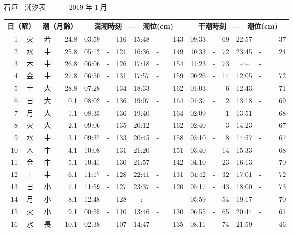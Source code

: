 \documentclass[12pt,a4j]{jsarticle}
\begin{document}
\pagestyle{empty}
 \begin{center}
 {\LARGE 石垣　潮汐表　　　}
 {\large 2019 年  1 月}\\
 \begin{table}[ht]
    \begin{tabular}{|rc|cr|ccrccr|ccrccr|}
    \hline
    \multicolumn{2}{|c|}{日（曜）} & \multicolumn{2}{c|}{潮（月齢）} & \multicolumn{6}{c|}{満潮時刻　―　潮位(cm)} & \multicolumn{6}{c|}{干潮時刻　―　潮位(cm)} \\
 \hline
 1 & 火 & 若 & 24.8 &  03:59 &-& 116  &  15:48 &-& 143  &   09:33 &-&  69  &   22:57 &-&  37  \\
 2 & 水 & 中 & 25.8 &  05:12 &-& 121  &  16:36 &-& 149  &   10:33 &-&  72  &   23:45 &-&  24  \\
 3 & 木 & 中 & 26.8 &  06:06 &-& 126  &  17:18 &-& 154  &   11:23 &-&  73  &   --:-- &-&~~~~~ \\
 4 & 金 & 中 & 27.8 &  06:50 &-& 131  &  17:57 &-& 159  &   00:26 &-&  14  &   12:05 &-&  72  \\
 5 & 土 & 大 & 28.8 &  07:28 &-& 134  &  18:33 &-& 162  &   01:03 &-&   6  &   12:43 &-&  71  \\
 6 & 日 & 大 &  0.1 &  08:02 &-& 136  &  19:07 &-& 164  &   01:37 &-&   2  &   13:18 &-&  69  \\
 7 & 月 & 大 &  1.1 &  08:35 &-& 136  &  19:40 &-& 164  &   02:09 &-&   1  &   13:51 &-&  68  \\
 8 & 火 & 大 &  2.1 &  09:06 &-& 135  &  20:12 &-& 162  &   02:40 &-&   3  &   14:23 &-&  67  \\
 9 & 水 & 中 &  3.1 &  09:37 &-& 133  &  20:45 &-& 158  &   03:10 &-&   8  &   14:57 &-&  67  \\
10 & 木 & 中 &  4.1 &  10:08 &-& 131  &  21:20 &-& 151  &   03:40 &-&  14  &   15:33 &-&  68  \\
11 & 金 & 中 &  5.1 &  10:41 &-& 130  &  21:57 &-& 142  &   04:10 &-&  23  &   16:13 &-&  70  \\
12 & 土 & 中 &  6.1 &  11:17 &-& 128  &  22:41 &-& 131  &   04:42 &-&  32  &   17:01 &-&  72  \\
13 & 日 & 小 &  7.1 &  11:59 &-& 127  &  23:37 &-& 120  &   05:17 &-&  43  &   18:00 &-&  73  \\
14 & 月 & 小 &  8.1 &  12:48 &-& 128  &  --:-- &-&~~~~~ &   05:59 &-&  54  &   19:17 &-&  70  \\
15 & 火 & 小 &  9.1 &  00:55 &-& 110  &  13:46 &-& 130  &   06:55 &-&  65  &   20:44 &-&  61  \\
16 & 水 & 長 & 10.1 &  02:38 &-& 107  &  14:47 &-& 135  &   08:11 &-&  74  &   21:59 &-&  46  \\

\end{tabular}
\end{table}
\end{center}
\end{document}
